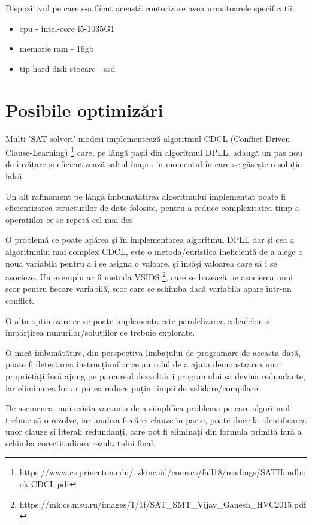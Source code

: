 Dispozitivul pe care s-a făcut această contorizare avea următoarele specificații:
\begin{itemize}
	\item cpu - intel-core i5-1035G1
	\item memorie ram - 16gb
	\item tip hard-disk stocare - ssd
\end{itemize}



\section{Posibile optimizări}

Mulți 'SAT solveri' moderi implementează algoritmul CDCL (Conflict-Driven-Clause-Learning) \footnote{https://www.cs.princeton.edu/~zkincaid/courses/fall18/readings/SATHandbook-CDCL.pdf}
 care, pe lângă pașii din algoritmul DPLL, adaugă un pas nou de învățare și eficientizează saltul înapoi în momentul în care se găsește o soluție falsă.

Un alt rafinament pe lângă îmbunătățirea algoritmului implementat poate fi eficientizarea structurilor de date folosite, pentru a reduce complexitatea timp a operațiilor ce se repetă cel mai des.

O problemă ce poate apărea și în implementarea algoritmul DPLL dar și cea a algoritmului mai complex CDCL, este o metoda/euristica ineficientă de a alege o nouă variabilă pentru a i se asigna o valoare, și însăși valoarea care să i se asocieze. Un exemplu ar fi metoda VSIDS 
\footnote{https://mk.cs.msu.ru/images/1/1f/SAT\_SMT\_Vijay\_Ganesh\_HVC2015.pdf}, care se bazează pe asocierea unui scor pentru fiecare variabilă, scor care se schimba dacă variabila apare într-un conflict. 

O alta optimizare ce se poate implementa este paralelizarea calculelor și împărțirea ramurilor/soluțiilor ce trebuie explorate.

O mică îmbunătățire, din perspectiva limbajului de programare de aceasta dată, poate fi detectarea instrucțiunilor ce au rolul de a ajuta demonstrarea unor proprietăți însă ajung pe parcursul dezvoltării programului să devină redundante, iar eliminarea lor ar putea reduce puțin timpii de validare/compilare.

De asemenea, mai exista varianta de a simplifica problema pe care algoritmul trebuie să o rezolve, iar analiza fiecărei clauze în parte, poate duce la identificarea unor clauze și literali redundanți, care pot fi eliminați din formula primită fără a schimba corectitudinea rezultatului final.
